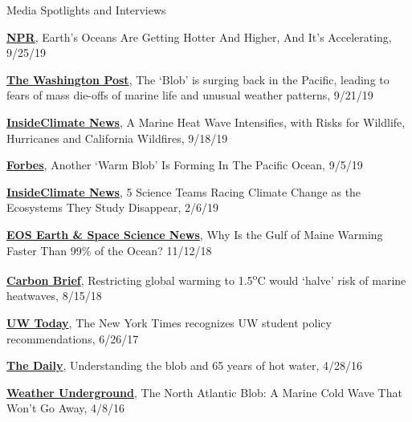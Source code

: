 \documentclass{resume} %
\begin{document}
\begin{rSection}{Media Spotlights and Interviews}

\href{https://www.npr.org/2019/09/25/755859707/earths-oceans-are-getting-hotter-and-higher-and-it-s-accelerating}{\textbf{NPR}}, Earth's Oceans Are Getting Hotter And Higher, And It's Accelerating, 9/25/19

\href{https://www.washingtonpost.com/weather/2019/09/21/blob-is-surging-back-pacific-leading-fears-mass-die-offs-marine-life-unusual-weather-patterns/}{\textbf{The Washington Post}}, The ‘Blob’ is surging back in the Pacific, leading to fears of mass die-offs of marine life and unusual weather patterns, 9/21/19

\href{https://insideclimatenews.org/news/17092019/marine-heat-wave-climate-change-pacific-coast-fish-wildlife-california-wildfires-hurricanes-hawaii}{\textbf{InsideClimate News}}, A Marine Heat Wave Intensifies, with Risks for Wildlife, Hurricanes and California Wildfires, 9/18/19

\href{https://www.forbes.com/sites/allenelizabeth/2019/09/05/another-warm-blob-is-forming-in-the-pacific-ocean/#6f979ec814af}{\textbf{Forbes}}, Another ‘Warm Blob’ Is Forming In The Pacific Ocean, 9/5/19

\href{https://insideclimatenews.org/news/06022019/climate-change-scientists-ecosystem-disappearing-mountain-glaciers-ice-forests-oceans}{\textbf{InsideClimate News}}, 5 Science Teams Racing Climate Change as the Ecosystems They Study Disappear, 2/6/19

\href{https://eos.org/features/why-is-the-gulf-of-maine-warming-faster-than-99-of-the-ocean}{\textbf{EOS Earth \& Space Science News}}, Why Is the Gulf of Maine Warming Faster Than 99\% of the Ocean? 11/12/18

\href{https://www.carbonbrief.org/restricting-global-warming-to-1-5c-would-halve-risk-of-marine-heatwaves}{\textbf{Carbon Brief}}, Restricting global warming to 1.5\textsuperscript{o}C would ‘halve’ risk of marine heatwaves, 8/15/18

\href{https://www.washington.edu/news/2017/06/26/the-new-york-times-recognizes-uw-student-policy-recommendations/}{\textbf{UW Today}}, The New York Times recognizes UW student policy recommendations, 6/26/17

\href{http://www.dailyuw.com/science/article_e6abdc30-0cf3-11e6-a211-7bcf0ff942f1.html#user-comment-area}{\textbf{The Daily}}, Understanding the blob and 65 years of hot water, 4/28/16

\href{https://www.wunderground.com/blog/JeffMasters/the-north-atlantic-blob-a-marine-cold-wave-that-wont-go-away.html}{\textbf{Weather Underground}}, The North Atlantic Blob: A Marine Cold Wave That Won’t Go Away, 4/8/16


\end{rSection}
\end{document}
